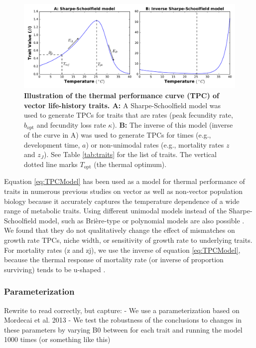 \begin{figure}[H] 
	\centering
	\includegraphics[width = .8\textwidth]{results/TPCModel.pdf}
	\caption{{\bf Illustration of the thermal performance curve (TPC) of vector life-history traits. A:} A Sharpe-Schoolfield model was used to generate TPCs for traits that are rates (peak fecundity rate, $b_\text{opt}$ and fecundity loss rate $\kappa$). {\bf B:} The inverse of this model (inverse of the curve in A) was used to generate TPCs for times (e.g., development time, $a$) or  non-unimodal rates (e.g., mortality rates $z$ and $z_J$). See Table \ref{tab:traits} for the list of traits. The vertical dotted line  marks $T_\text{opt}$ (the thermal optimum).}
\label{fig:TPCModel}
\end{figure} 

Equation \eqref{eq:TPCModel} has been used as a model for thermal performance of traits in numerous previous studies on vector \citep[e.g.,][]{Molnar2013} as well as non-vector \citep[e.g.,][]{Dell2011a,Pawar2016}   population biology because it accurately captures the temperature dependence of a wide range of metabolic traits. Using different unimodal models instead of the Sharpe-Schoolfield model, such as Bri\`{e}re-type or polynomial models are also possible  \citep{Mordecai2012,Johnson2015,Mordecai2017}. We found that they do not qualitatively change the effect of mismatches on growth rate TPCs, niche width, or sensitivity of growth rate to underlying traits. For mortality rates (z and zj), we use the inverse of equation \eqref{eq:TPCModel}, because the thermal response of mortality rate (or inverse of proportion surviving) tends to be u-shaped \citep{Lunde2013,Mordecai2012,Johnson2015}.         

\subsubsection*{Parameterization}
Rewrite to read correctly, but capture:
- We use a parameterization based on Mordecai et al. 2013 
- We test the robustness of the conclusions to changes in these parameters by varying B0 between for each trait and running the model 1000 times (or something like this)

